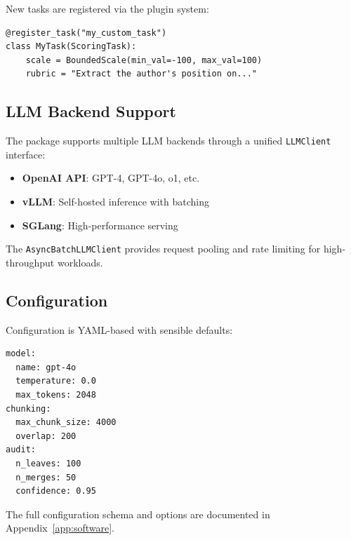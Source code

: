 New tasks are registered via the plugin system:

\begin{lstlisting}
@register_task("my_custom_task")
class MyTask(ScoringTask):
    scale = BoundedScale(min_val=-100, max_val=100)
    rubric = "Extract the author's position on..."
\end{lstlisting}

\subsection{LLM Backend Support}

The package supports multiple LLM backends through a unified \texttt{LLMClient} interface:

\begin{itemize}[nosep]
    \item \textbf{OpenAI API}: GPT-4, GPT-4o, o1, etc.
    \item \textbf{vLLM}: Self-hosted inference with batching
    \item \textbf{SGLang}: High-performance serving
\end{itemize}

The \texttt{AsyncBatchLLMClient} provides request pooling and rate limiting for high-throughput workloads.

\subsection{Configuration}

Configuration is YAML-based with sensible defaults:

\begin{lstlisting}
model:
  name: gpt-4o
  temperature: 0.0
  max_tokens: 2048
chunking:
  max_chunk_size: 4000
  overlap: 200
audit:
  n_leaves: 100
  n_merges: 50
  confidence: 0.95
\end{lstlisting}

The full configuration schema and options are documented in Appendix~\ref{app:software}.

